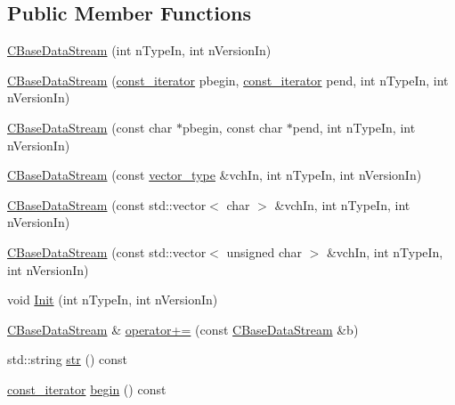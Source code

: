 \subsection*{Public Member Functions}
\begin{DoxyCompactItemize}
\item 
\mbox{\hyperlink{class_c_base_data_stream_a2713ae60ccb209e599777252209e770b}{C\+Base\+Data\+Stream}} (int n\+Type\+In, int n\+Version\+In)
\item 
\mbox{\hyperlink{class_c_base_data_stream_ad53847bb8cdede2cdf271f14eb651ba6}{C\+Base\+Data\+Stream}} (\mbox{\hyperlink{class_c_base_data_stream_a9cf3080c5a75c94568980a59d3aab3ad}{const\+\_\+iterator}} pbegin, \mbox{\hyperlink{class_c_base_data_stream_a9cf3080c5a75c94568980a59d3aab3ad}{const\+\_\+iterator}} pend, int n\+Type\+In, int n\+Version\+In)
\item 
\mbox{\hyperlink{class_c_base_data_stream_a2433bc0a7b7b112cf38b81af0ef898c8}{C\+Base\+Data\+Stream}} (const char $\ast$pbegin, const char $\ast$pend, int n\+Type\+In, int n\+Version\+In)
\item 
\mbox{\hyperlink{class_c_base_data_stream_a113389383acd7b7e48a4a54c6b713551}{C\+Base\+Data\+Stream}} (const \mbox{\hyperlink{class_c_base_data_stream_a035e97a3e024a8cfa4690eaca1e5e290}{vector\+\_\+type}} \&vch\+In, int n\+Type\+In, int n\+Version\+In)
\item 
\mbox{\hyperlink{class_c_base_data_stream_a9f49c3d8343a6b9bb9b16e21dc304321}{C\+Base\+Data\+Stream}} (const std\+::vector$<$ char $>$ \&vch\+In, int n\+Type\+In, int n\+Version\+In)
\item 
\mbox{\hyperlink{class_c_base_data_stream_a7dd6b67c520b5d2ad7a39d94632ebd19}{C\+Base\+Data\+Stream}} (const std\+::vector$<$ unsigned char $>$ \&vch\+In, int n\+Type\+In, int n\+Version\+In)
\item 
void \mbox{\hyperlink{class_c_base_data_stream_a2d828ad342dacde5b5feae046702fb53}{Init}} (int n\+Type\+In, int n\+Version\+In)
\item 
\mbox{\hyperlink{class_c_base_data_stream}{C\+Base\+Data\+Stream}} \& \mbox{\hyperlink{class_c_base_data_stream_abf8f25622242ad01ddb049ee4260e7ab}{operator+=}} (const \mbox{\hyperlink{class_c_base_data_stream}{C\+Base\+Data\+Stream}} \&b)
\item 
std\+::string \mbox{\hyperlink{class_c_base_data_stream_ad7e170426e8f8bc2794b2391f27c0fd1}{str}} () const
\item 
\mbox{\hyperlink{class_c_base_data_stream_a9cf3080c5a75c94568980a59d3aab3ad}{const\+\_\+iterator}} \mbox{\hyperlink{class_c_base_data_stream_abed61420f8a28a0c7ea0baeaa87b925b}{begin}} () const

\end{DoxyCompactItemize}
